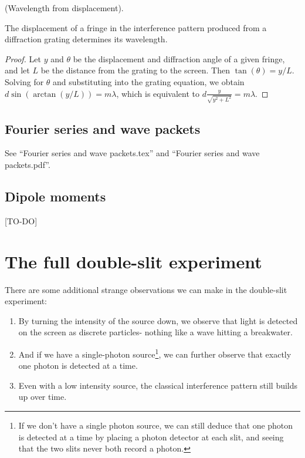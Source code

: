 \documentclass{article}
\begin{document}
\begin{theorem}
	(Wavelength from displacement). 
	
	The displacement of a fringe in the interference pattern produced from a diffraction grating determines its wavelength.
\end{theorem}

\begin{proof}
	Let $y$ and $\theta$ be the displacement and diffraction angle of a given fringe, and let $L$ be the distance from the grating to the screen. Then $\tan(\theta) = y/L$. Solving for $\theta$ and substituting into the grating equation, we obtain $d\sin(\arctan(y/L)) = m \lambda$, which is equivalent to $d\frac{y}{\sqrt{y^2 + L^2}} = m\lambda$.
\end{proof}

\subsection*{Fourier series and wave packets}

See ``Fourier series and wave packets.tex'' and ``Fourier series and wave packets.pdf''.

\subsection*{Dipole moments}

[TO-DO]

\section*{The full double-slit experiment}

There are some additional strange observations we can make in the double-slit experiment:

\begin{enumerate}
	\item By turning the intensity of the source down, we observe that light is detected on the screen as discrete particles- nothing like a wave hitting a breakwater.
	\item And if we have a single-photon source\footnote{If we don’t have a single photon source, we can still deduce that one photon is detected at a time by placing a photon detector at each slit, and seeing that the two slits never both record a photon.}, we can further observe that exactly one photon is detected at a time.
	\item Even with a low intensity source, the classical interference pattern still builds up over time.
\end{enumerate}
\end{document}
